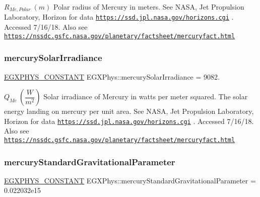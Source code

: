 $R_{Me,Polar} \ (m)$ Polar radius of Mercury in meters. See N\+A\+SA, Jet Propulsion Laboratory, Horizon for data \href{https://ssd.jpl.nasa.gov/horizons.cgi}{\tt https\+://ssd.\+jpl.\+nasa.\+gov/horizons.\+cgi} . Accessed 7/16/18. Also see \href{https://nssdc.gsfc.nasa.gov/planetary/factsheet/mercuryfact.html}{\tt https\+://nssdc.\+gsfc.\+nasa.\+gov/planetary/factsheet/mercuryfact.\+html} \mbox{\label{group___e_g_x_phys-_constants-_astrophysics-_solar_system-_mercury-_bulk_ga36990b1744cb8a5cfaaf68771dde41fd}} 
\subsubsection{\texorpdfstring{mercury\+Solar\+Irradiance}{mercurySolarIrradiance}}
{\footnotesize\ttfamily \mbox{\hyperlink{group___e_g_x_phys-_constants-_macros_ga76980d288494ce1714c9ac68a95ba702}{E\+G\+X\+P\+H\+Y\+S\+\_\+\+C\+O\+N\+S\+T\+A\+NT}} E\+G\+X\+Phys\+::mercury\+Solar\+Irradiance = 9082.}

$ Q_{Me} \ (\dfrac{W}{m^2})$ Solar irradiance of Mercury in watts per meter squared. The solar energy landing on mercury per unit area. See N\+A\+SA, Jet Propulsion Laboratory, Horizon for data \href{https://ssd.jpl.nasa.gov/horizons.cgi}{\tt https\+://ssd.\+jpl.\+nasa.\+gov/horizons.\+cgi} . Accessed 7/16/18. Also see \href{https://nssdc.gsfc.nasa.gov/planetary/factsheet/mercuryfact.html}{\tt https\+://nssdc.\+gsfc.\+nasa.\+gov/planetary/factsheet/mercuryfact.\+html} \mbox{\label{group___e_g_x_phys-_constants-_astrophysics-_solar_system-_mercury-_bulk_ga55795db902bdf2ac1e4db46bab3e0edb}} 
\subsubsection{\texorpdfstring{mercury\+Standard\+Gravitational\+Parameter}{mercuryStandardGravitationalParameter}}
{\footnotesize\ttfamily \mbox{\hyperlink{group___e_g_x_phys-_constants-_macros_ga76980d288494ce1714c9ac68a95ba702}{E\+G\+X\+P\+H\+Y\+S\+\_\+\+C\+O\+N\+S\+T\+A\+NT}} E\+G\+X\+Phys\+::mercury\+Standard\+Gravitational\+Parameter = 0.\+022032e15}

